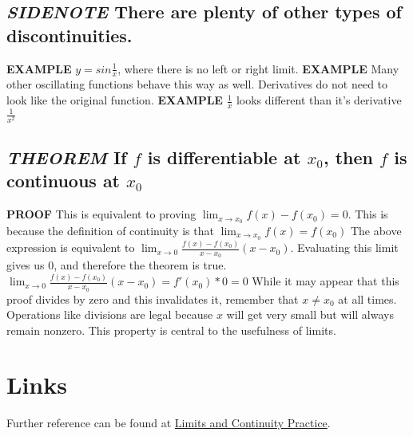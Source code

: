 \documentclass[letterpaper]{article}
\begin{document}
\subsection{\emph{SIDENOTE} There are plenty of other types of discontinuities.}
\label{sec:orga986451}
\textbf{EXAMPLE} \(y = sin \frac{1}{x}\), where there is no left or right limit.
\textbf{EXAMPLE} Many other oscillating functions behave this way as well.
Derivatives do not need to look like the original function.
\textbf{EXAMPLE} \(\frac{1}{x}\) looks different than it's derivative \(\frac{1}{x^2}\)
\subsection{\emph{THEOREM} If \(f\) is differentiable at \(x_0\), then \(f\) is continuous at \(x_0\)}
\label{sec:orgd9f9006}
\textbf{PROOF}
This is equivalent to proving \(\lim_{x \rightarrow x_0} f(x) - f(x_0) = 0\).
  This is because the definition of continuity is that \(\lim_{x \rightarrow x_0} f(x) = f(x_0)\)
The above expression is equivalent to \(\lim_{x\rightarrow0} \frac{f(x) - f(x_0)}{x-x_0} (x-x_0)\).
Evaluating this limit gives us 0, and therefore the theorem is true.
\(\lim_{x\rightarrow0} \frac{f(x) - f(x_0)}{x-x_0} (x-x_0) = f'(x_0) * 0 = 0\)
While it may appear that this proof divides by zero and this invalidates it, remember that \(x \neq x_0\) at all times. Operations like divisions are legal because \(x\) will get very small but will always remain nonzero. This property is central to the usefulness of limits.

\section{Links}
\label{sec:orgcfe0354}

Further reference can be found at \href{limits-continuity-problems.org}{Limits and Continuity Practice}.
\end{document}
